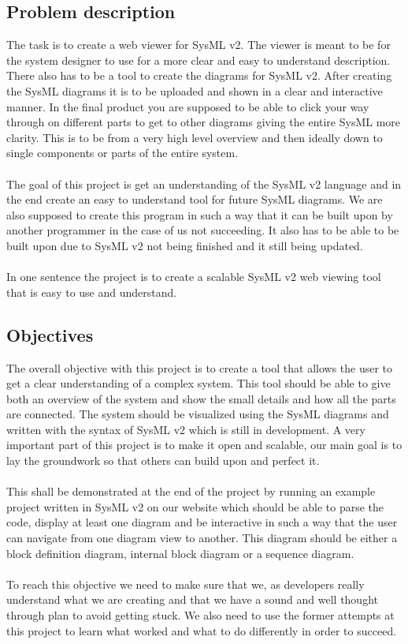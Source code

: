 \documentclass{article}
\begin{document}
\subsection{Problem description}
The task is to create a web viewer for SysML v2. The viewer is meant to be for the system designer to use for a more clear and easy to understand description. There also has to be a tool to create the diagrams for SysML v2. After creating the SysML diagrams it is to be uploaded and shown in a clear and interactive manner. In the final product you are supposed to be able to click your way through on different parts to get to other diagrams giving the entire SysML more clarity. This is to be from a very high level overview and then ideally down to single components or parts of the entire system.
\\\\
The goal of this project is get an understanding of the SysML v2 language and in the end create an easy to understand tool for future SysML diagrams. We are also supposed to create this program in such a way that it can be built upon by another programmer in the case of us not succeeding. It also has to be able to be built upon due to SysML v2 not being finished and it still being updated. 
\\\\
In one sentence the project is to create a scalable SysML v2 web viewing tool that is easy to use and understand.

\subsection{Objectives}
The overall objective with this project is to create a tool that allows the user to get a clear understanding of a complex system. This tool should be able to give both an overview of the system and show the small details and how all the parts are connected. The system should be visualized using the SysML diagrams and written with the syntax of SysML v2 which is still in development. A very important part of this project is to make it open and scalable, our main goal is to lay the groundwork so that others can build upon and perfect it. 
\\\\
This shall be demonstrated at the end of the project by running an example project written in SysML v2 on our website which should be able to parse the code, display at least one diagram and be interactive in such a way that the user can navigate from one diagram view to another. This diagram should be either a block definition diagram, internal block diagram or a sequence diagram. 
\\\\
To reach this objective we need to make sure that we, as developers really understand what we are creating and that we have a sound and well thought through plan to avoid getting stuck. We also need to use the former attempts at this project to learn what worked and what to do differently in order to succeed.
\end{document}
